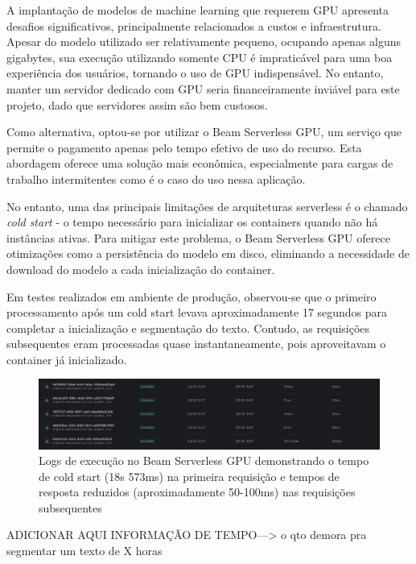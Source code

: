 \documentclass[tcc,capa]{texufpel}
\begin{document}
A implantação de modelos de machine learning que requerem GPU apresenta desafios significativos, principalmente relacionados a custos e infraestrutura. Apesar do modelo utilizado ser relativamente pequeno, ocupando apenas alguns gigabytes, sua execução utilizando somente CPU é impraticável para uma boa experiência dos usuários, tornando o uso de GPU indispensável. No entanto, manter um servidor dedicado com GPU seria financeiramente inviável para este projeto, dado que servidores assim são bem custosos.

Como alternativa, optou-se por utilizar o Beam Serverless GPU, um serviço que permite o pagamento apenas pelo tempo efetivo de uso do recurso. Esta abordagem oferece uma solução mais econômica, especialmente para cargas de trabalho intermitentes como é o caso do uso nessa aplicação.

No entanto, uma das principais limitações de arquiteturas serverless é o chamado \textit{cold start} - o tempo necessário para inicializar os containers quando não há instâncias ativas. Para mitigar este problema, o Beam Serverless GPU oferece otimizações como a persistência do modelo em disco, eliminando a necessidade de download do modelo a cada inicialização do container.

Em testes realizados em ambiente de produção, observou-se que o primeiro processamento após um cold start levava aproximadamente 17 segundos para completar a inicialização e segmentação do texto. Contudo, as requisições subsequentes eram processadas quase instantaneamente, pois aproveitavam o container já inicializado.


\begin{figure}[H]
  \centering
  \includegraphics[width=\textwidth,height=0.45\textheight,keepaspectratio]{exemplo-slides/graphics/images/logs-beam.png}
  \caption{Logs de execução no Beam Serverless GPU demonstrando o tempo de cold start (18s 573ms) na primeira requisição e tempos de resposta reduzidos (aproximadamente 50-100ms) nas requisições subsequentes}
  \label{fig:beam_logs_execution}
\end{figure}



ADICIONAR AQUI INFORMAÇÃO DE TEMPO---> o qto demora pra segmentar um texto de X horas
\end{document}
